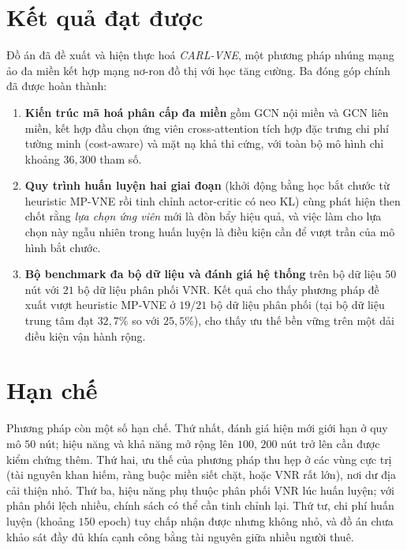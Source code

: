 \documentclass[../DoAn.tex]{subfiles}
\begin{document}
\label{ch:ket_luan}

\section*{Kết quả đạt được}              %

Đồ án đã đề xuất và hiện thực hoá \textit{CARL-VNE}, một phương pháp nhúng mạng ảo đa miền kết hợp mạng nơ-ron đồ thị với học tăng cường. Ba đóng góp chính đã được hoàn thành:

\begin{enumerate}
\item \textbf{Kiến trúc mã hoá phân cấp đa miền} gồm GCN nội miền và GCN liên miền, kết hợp đầu chọn ứng viên cross-attention tích hợp đặc trưng chi phí tường minh (cost-aware) và mặt nạ khả thi cứng, với toàn bộ mô hình chỉ khoảng $36{,}300$ tham số.
\item \textbf{Quy trình huấn luyện hai giai đoạn} (khởi động bằng học bắt chước từ heuristic MP-VNE rồi tinh chỉnh actor-critic có neo KL) cùng phát hiện then chốt rằng \textit{lựa chọn ứng viên} mới là đòn bẩy hiệu quả, và việc làm cho lựa chọn này ngẫu nhiên trong huấn luyện là điều kiện cần để vượt trần của mô hình bắt chước.
\item \textbf{Bộ benchmark đa bộ dữ liệu và đánh giá hệ thống} trên bộ dữ liệu $50$ nút với $21$ bộ dữ liệu phân phối VNR. Kết quả cho thấy phương pháp đề xuất vượt heuristic MP-VNE ở $19/21$ bộ dữ liệu phân phối (tại bộ dữ liệu trung tâm đạt $32{,}7\%$ so với $25{,}5\%$), cho thấy ưu thế bền vững trên một dải điều kiện vận hành rộng.
\end{enumerate}

\section*{Hạn chế}                      %

Phương pháp còn một số hạn chế. Thứ nhất, đánh giá hiện mới giới hạn ở quy mô $50$ nút; hiệu năng và khả năng mở rộng lên $100$, $200$ nút trở lên cần được kiểm chứng thêm. Thứ hai, ưu thế của phương pháp thu hẹp ở các vùng cực trị (tài nguyên khan hiếm, ràng buộc miền siết chặt, hoặc VNR rất lớn), nơi dư địa cải thiện nhỏ. Thứ ba, hiệu năng phụ thuộc phân phối VNR lúc huấn luyện; với phân phối lệch nhiều, chính sách có thể cần tinh chỉnh lại. Thứ tư, chi phí huấn luyện (khoảng $150$ epoch) tuy chấp nhận được nhưng không nhỏ, và đồ án chưa khảo sát đầy đủ khía cạnh công bằng tài nguyên giữa nhiều người thuê.
\end{document}
